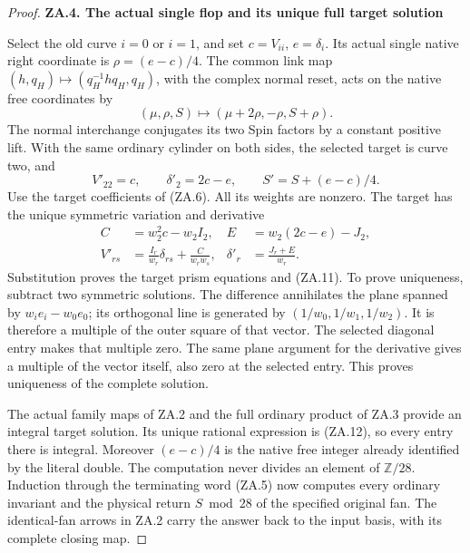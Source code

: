 \begin{proof}
\medskip\noindent\textbf{ZA.4. The actual single flop and its unique full target solution}

\par\nopagebreak[4]

Select the old curve \(i=0\) or \(i=1\), and set
\(c=V_{ii}\), \(e=\delta_i\). Its actual single native right
coordinate is \(\rho=(e-c)/4\). The common link map
\((h,q_H)\mapsto(q_H^{-1}hq_H,q_H)\), with the complex normal
reset, acts on the native free coordinates by
\[
(\mu,\rho,S)\longmapsto(\mu+2\rho,-\rho,S+\rho).
                                                               \tag{ZA.10}
\]
The normal interchange conjugates its two Spin factors by a constant
positive lift. With the same ordinary cylinder on both sides, the
selected target is curve two, and
\[
V'_{22}=c,\qquad\delta'_2=2c-e,\qquad S'=S+(e-c)/4.
                                                               \tag{ZA.11}
\]
Use the target coefficients of (ZA.6). All its weights are nonzero.
The target has the unique symmetric variation and derivative
\[
\begin{aligned}
C&=w_2^2c-w_2I_2,& E&=w_2(2c-e)-J_2,\\
V'_{rs}&=\frac{I_r}{w_r}\delta_{rs}+\frac{C}{w_rw_s},&
\delta'_r&=\frac{J_r+E}{w_r}.
\end{aligned}                                           \tag{ZA.12}
\]
Substitution proves the target prism equations and (ZA.11). To prove
uniqueness, subtract two symmetric solutions. The difference
annihilates the plane spanned by \(w_i e_i-w_0e_0\); its orthogonal
line is generated by \((1/w_0,1/w_1,1/w_2)\). It is therefore a
multiple of the outer square of that vector. The selected diagonal
entry makes that multiple zero. The same plane argument for the
derivative gives a multiple of the vector itself, also zero at the
selected entry. This proves uniqueness of the complete solution.

The actual family maps of ZA.2 and the full ordinary product of ZA.3
provide an integral target solution. Its unique rational expression
is (ZA.12), so every entry there is integral. Moreover \((e-c)/4\)
is the native free integer already identified by the literal double.
The computation never divides an element of \(\mathbb Z/28\).
Induction through the terminating word (ZA.5) now computes every
ordinary invariant and the physical return \(S\bmod28\) of the
specified original fan. The identical-fan arrows in ZA.2 carry the
answer back to the input basis, with its complete closing map.

\par


\end{proof}
